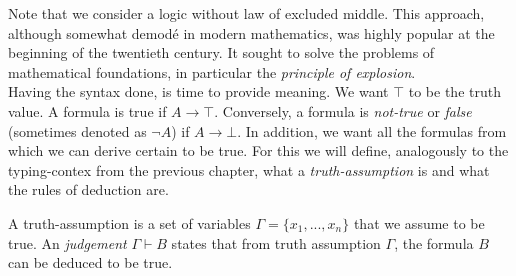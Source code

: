 Note that we consider a logic without law of excluded middle. This approach, although somewhat demodé in modern mathematics, was highly popular at the beginning of the twentieth century. It sought to solve the problems of mathematical foundations, in particular the \emph{principle of explosion}. \\

Having the syntax done, is time to provide meaning. We want $\top$ to be the truth value. A formula is true if $A \to \top$. Conversely, a formula is \emph{not-true} or \emph{false} (sometimes denoted as $\neg A$) if $ A \to \bot$. In addition, we want all the formulas from which we can derive certain to be true. For this we will define, analogously to the typing-contex from the previous chapter, what a \emph{truth-assumption} is and  what the rules of deduction are.

\begin{definition}
 A truth-assumption is a set of variables $\Gamma = \{x_1,...,x_n\}$ that we assume to be true. An \emph{judgement} $\Gamma \vdash B$ states that from truth assumption $\Gamma$, the formula $B$ can be deduced to be true. 
\end{definition}

